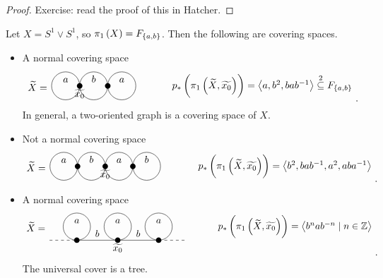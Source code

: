 \begin{proof}
Exercise: read the proof of this in Hatcher.
\end{proof}

\begin{example*}
Let $ X = S^1 \vee S^1 $, so $ \pi_1\br{X} = F_{\cbr{a, b}} $. Then the following are covering spaces.
\begin{itemize}
\item A normal covering space
$$
\begin{tikzpicture}
\draw (-1, 0) node{$ \widetilde{X} = $};
\draw (0, 0) circle (0.5) node[above]{$ a $};
\fill (0.5, 0) circle (0.1) node[below]{$ \widetilde{x_0} $};
\draw (1, 0) circle (0.5) node[above]{$ b $};
\fill (1.5, 0) circle (0.1);
\draw (2, 0) circle (0.5) node[above]{$ a $};
\draw (7, 0) node{$ p_*\br{\pi_1\br{\widetilde{X}, \widetilde{x_0}}} = \abr{a, b^2, bab^{-1}} \overset{2}{\subseteq} F_{\cbr{a, b}} $};
\end{tikzpicture}.
$$
In general, a two-oriented graph is a covering space of $ X $.
\item Not a normal covering space
$$
\begin{tikzpicture}
\draw (-1, 0) node{$ \widetilde{X} = $};
\draw (0, 0) circle (0.5) node[above]{$ a $};
\fill (0.5, 0) circle (0.1);
\draw (1, 0) circle (0.5) node[above]{$ b $};
\fill (1.5, 0) circle (0.1) node[below]{$ \widetilde{x_0} $};
\draw (2, 0) circle (0.5) node[above]{$ a $};
\fill (2.5, 0) circle (0.1);
\draw (3, 0) circle (0.5) node[above]{$ b $};
\draw (8, 0) node{$ p_*\br{\pi_1\br{\widetilde{X}, \widetilde{x_0}}} = \abr{b^2, bab^{-1}, a^2, aba^{-1}} $};
\end{tikzpicture}.
$$
\item A normal covering space
$$
\begin{tikzpicture}
\draw (-0.5, 0) node{$ \widetilde{X} = $};
\draw [dashed] (0, -0.5) to (1, -0.5);
\fill (1, -0.5) circle (0.1);
\draw (1, 0) circle (0.5) node[above]{$ a $};
\draw (1, -0.5) to node[above]{$ b $} (2.5, -0.5);
\fill (2.5, -0.5) circle (0.1) node[below]{$ \widetilde{x_0} $};
\draw (2.5, 0) circle (0.5) node[above]{$ a $};
\draw (2.5, -0.5) to node[above]{$ b $} (4, -0.5);
\fill (4, -0.5) circle (0.1);
\draw (4, 0) circle (0.5) node[above]{$ a $};
\draw [dashed] (4, -0.5) to (5, -0.5);
\draw (9, 0) node{$ p_*\br{\pi_1\br{\widetilde{X}, \widetilde{x_0}}} = \abr{b^nab^{-n} \mid n \in \Z} $};
\end{tikzpicture}.
$$
The universal cover is a tree.
\end{itemize}
\end{example*}


